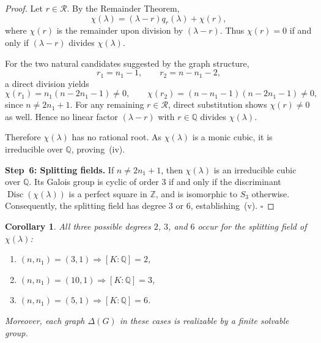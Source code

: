 \documentclass[11pt]{amsart}
\newtheorem{cor}[thm]{\bf Corollary}
\begin{document}
\begin{proof}
Let $r\in\mathcal{R}$. By the Remainder Theorem,
\[
\chi(\lambda)=(\lambda-r)q_r(\lambda)+\chi(r),
\]
where $\chi(r)$ is the remainder upon division by $(\lambda-r)$. Thus $\chi(r)=0$ if and only if $(\lambda-r)$ divides $\chi(\lambda)$.

For the two natural candidates suggested by the graph structure,
\[
r_1=n_1-1,\qquad r_2=n-n_1-2,
\]
a direct division yields
\[
\chi(r_1)=n_1(n-2n_1-1)\neq0,
\qquad
\chi(r_2)=(n-n_1-1)(n-2n_1-1)\neq0,
\]
since $n\neq 2n_1+1$. For any remaining $r\in\mathcal{R}$, direct substitution shows $\chi(r)\neq0$ as well. Hence no linear factor $(\lambda-r)$ with $r\in\mathbb{Q}$ divides $\chi(\lambda)$.

Therefore $\chi(\lambda)$ has no rational root. As $\chi(\lambda)$ is a monic cubic, it is irreducible over $\mathbb{Q}$, proving~(iv).

\medskip
\noindent\textbf{Step~6: Splitting fields.}
If $n\neq 2n_1+1$, then $\chi(\lambda)$ is an irreducible cubic over $\mathbb{Q}$. Its Galois group is cyclic of order $3$ if and only if the discriminant $\operatorname{Disc}(\chi(\lambda))$ is a perfect square in $\mathbb{Z}$, and is isomorphic to $S_3$ otherwise. Consequently, the splitting field has degree $3$ or $6$, establishing~(v). \hfill $\square$
\end{proof}

\begin{cor}\label{cor:degree-values}
All three possible degrees $2$, $3$, and $6$ occur for the splitting field of $\chi(\lambda)$:
\begin{enumerate}[label=\textup{(\alph*)}]
    \item $(n,n_1)=(3,1) \Rightarrow [K:\mathbb{Q}]=2$,
    \item $(n,n_1)=(10,1) \Rightarrow [K:\mathbb{Q}]=3$,
    \item $(n,n_1)=(5,1) \Rightarrow [K:\mathbb{Q}]=6$.
\end{enumerate}
Moreover, each graph $\Delta(G)$ in these cases is realizable by a finite solvable group.
\end{cor}
\end{document}
